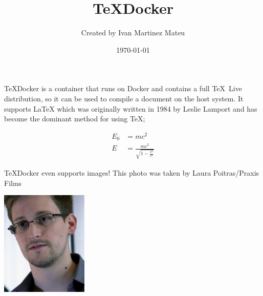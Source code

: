 \documentclass[12pt]{article}
\title{\TeX Docker}
\author{Created by Ivan Martinez Mateu}
\date{\today}
\begin{document}
  \maketitle
  \TeX Docker is a container that runs on Docker and contains a full \TeX{} Live distribution, so it can be used to compile a document on the host system. It supports \LaTeX{} which was originally written 
  in 1984 by Leslie Lamport and has become the dominant method for
  using \TeX;
 
  \begin{align}
    E_0 &= mc^2                              \\
    E &= \frac{mc^2}{\sqrt{1-\frac{v^2}{c^2}}}
  \end{align}


 \TeX Docker  even supports images! This photo was taken by Laura Poitras/Praxis Films

  \includegraphics[height=5cm, keepaspectratio]{snowden}
\end{document}
